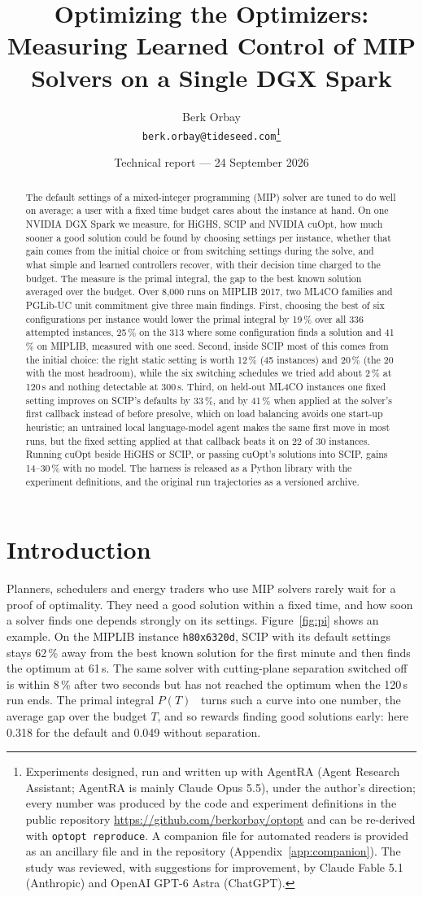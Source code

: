 \documentclass[11pt]{article}
\title{Optimizing the Optimizers:\\ Measuring Learned Control of MIP Solvers on a Single DGX Spark}
\author{Berk Orbay\\ \small\texttt{berk.orbay@tideseed.com}\thanks{Experiments designed, run and written up with AgentRA (Agent Research Assistant; AgentRA is mainly Claude Opus 5.5), under the author's direction; every number was produced by the code and experiment definitions in the public repository
\url{https://github.com/berkorbay/optopt} and can be re-derived with \texttt{optopt reproduce}. A companion file for
automated readers is provided as an ancillary file and in the repository (Appendix~\ref{app:companion}). The study was reviewed, with suggestions for improvement, by Claude
Fable 5.1 (Anthropic) and OpenAI GPT-6 Astra (ChatGPT).}}
\date{Technical report --- 24 September 2026}
\begin{document}
\maketitle

\begin{abstract}
The default settings of a mixed-integer programming (MIP) solver are tuned to do well on average; a user with a fixed
time budget cares about the instance at hand. On one NVIDIA DGX Spark we measure, for HiGHS, SCIP and NVIDIA cuOpt,
how much sooner a good solution could be found by choosing settings per instance, whether that gain comes from the
initial choice or from switching settings during the solve, and what simple and learned controllers recover, with
their decision time charged to the budget. The measure is the primal integral, the gap to the best known solution
averaged over the budget. Over 8{,}000 runs on MIPLIB 2017, two ML4CO families and PGLib-UC unit commitment give
three main findings. First, choosing the best of six configurations per instance would lower the primal integral by
19\,\% over all 336 attempted instances, 25\,\% on the 313 where some configuration finds a solution and 41\,\% on
MIPLIB, measured with one seed. Second, inside SCIP most of this comes from the initial choice: the right static
setting is worth 12\,\% (45 instances) and 20\,\% (the 20 with the most headroom), while the six switching schedules
we tried add about 2\,\% at 120\,s and nothing detectable at 300\,s. Third, on held-out ML4CO instances one fixed
setting improves on SCIP's defaults by 33\,\%, and by 41\,\% when applied at the solver's first callback instead of
before presolve, which on load balancing avoids one start-up heuristic; an untrained local language-model agent makes the same first move in most runs, but the fixed
setting applied at that callback beats it on 22 of 30 instances. Running cuOpt beside HiGHS or SCIP, or passing
cuOpt's solutions into SCIP, gains 14--30\,\% with no model. The harness is released as a Python library with the
experiment definitions, and the original run trajectories as a versioned archive.
\end{abstract}

\section{Introduction}
Planners, schedulers and energy traders who use MIP solvers rarely wait for a proof of optimality. They need a good
solution within a fixed time, and how soon a solver finds one depends strongly on its settings.
Figure~\ref{fig:pi} shows an example. On the MIPLIB instance \texttt{h80x6320d}, SCIP with its default settings stays
62\,\% away from the best known solution for the first minute and then finds the optimum at 61\,s. The same solver
with cutting-plane separation switched off is within 8\,\% after two seconds but has not reached the optimum when the
120\,s run ends. The primal integral $P(T)$~\citep{berthold2013primal} turns such a curve into one number, the
average gap over the budget $T$, and so rewards finding good solutions early: here 0.318 for the default and 0.049
without separation.
\end{document}
